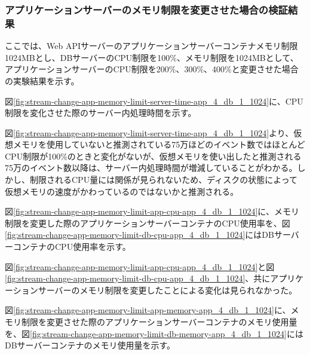 \documentclass[../../../../main]{subfiles}
\begin{document}
    \subsubsection{アプリケーションサーバーのメモリ制限を変更させた場合の検証結果}\label{subsubsec:result-streaming-change-app-memory}

    ここでは、Web APIサーバーのアプリケーションサーバーコンテナメモリ制限1024MBとし、DBサーバーのCPU制限を100\%、メモリ制限を1024MBとして、アプリケーションサーバーのCPU制限を200\%、300\%、400\%と変更させた場合の実験結果を示す。


    図\ref{fig:stream-change-app-memory-limit-server-time-app_4_db_1_1024}に、CPU制限を変化させた際のサーバー内処理時間を示す。

    

    図\ref{fig:stream-change-app-memory-limit-server-time-app_4_db_1_1024}より、仮想メモリを使用していないと推測されている75万ほどのイベント数ではほとんどCPU制限が100\%のときと変化がないが、仮想メモリを使い出したと推測される75万のイベント数以降は、サーバー内処理時間が増減していることがわかる。しかし、制限されるCPU量には関係が見られないため、ディスクの状態によって仮想メモリの速度がかわっているのではないかと推測される。


    図\ref{fig:stream-change-app-memory-limit-app-cpu-app_4_db_1_1024}に、メモリ制限を変更した際のアプリケーションサーバーコンテナのCPU使用率を、図\ref{fig:stream-change-app-memory-limit-db-cpu-app_4_db_1_1024}にはDBサーバーコンテナのCPU使用率を示す。

    

    

    図\ref{fig:stream-change-app-memory-limit-app-cpu-app_4_db_1_1024}と図\ref{fig:stream-change-app-memory-limit-db-cpu-app_4_db_1_1024}、共にアプリケーションサーバーのメモリ制限を変更したことによる変化は見られなかった。


    図\ref{fig:stream-change-app-memory-limit-app-memory-app_4_db_1_1024}に、メモリ制限を変更させた際のアプリケーションサーバーコンテナのメモリ使用量を、図\ref{fig:stream-change-app-memory-limit-db-memory-app_4_db_1_1024}にはDBサーバーコンテナのメモリ使用量を示す。
\end{document}
